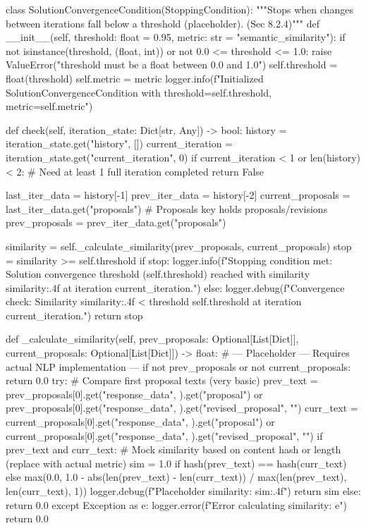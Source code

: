 \documentclass{amsbook}
\theoremstyle{definition}
\theoremstyle{remark}
\numberwithin{equation}{chapter} %
\begin{document}
\begin{python}
class SolutionConvergenceCondition(StoppingCondition):
    """Stops when changes between iterations fall below a threshold (placeholder). (Sec 8.2.4)"""
    def __init__(self, threshold: float = 0.95, metric: str = "semantic_similarity"):
        if not isinstance(threshold, (float, int)) or not 0.0 <= threshold <= 1.0:
             raise ValueError("threshold must be a float between 0.0 and 1.0")
        self.threshold = float(threshold)
        self.metric = metric
        logger.info(f"Initialized SolutionConvergenceCondition with threshold={self.threshold}, metric={self.metric}")

    def check(self, iteration_state: Dict[str, Any]) -> bool:
        history = iteration_state.get("history", [])
        current_iteration = iteration_state.get("current_iteration", 0)
        if current_iteration < 1 or len(history) < 2: # Need at least 1 full iteration completed
            return False

        last_iter_data = history[-1]
        prev_iter_data = history[-2]
        current_proposals = last_iter_data.get("proposals") # Proposals key holds proposals/revisions
        prev_proposals = prev_iter_data.get("proposals")

        similarity = self._calculate_similarity(prev_proposals, current_proposals)
        stop = similarity >= self.threshold
        if stop:
             logger.info(f"Stopping condition met: Solution convergence threshold ({self.threshold}) reached with similarity {similarity:.4f} at iteration {current_iteration}.")
        else:
             logger.debug(f"Convergence check: Similarity {similarity:.4f} < threshold {self.threshold} at iteration {current_iteration}.")
        return stop

    def _calculate_similarity(self, prev_proposals: Optional[List[Dict]], current_proposals: Optional[List[Dict]]) -> float:
        # --- Placeholder --- Requires actual NLP implementation ---
        if not prev_proposals or not current_proposals: return 0.0
        try:
            # Compare first proposal texts (very basic)
            prev_text = prev_proposals[0].get("response_data", {}).get("proposal") or prev_proposals[0].get("response_data", {}).get("revised_proposal", "")
            curr_text = current_proposals[0].get("response_data", {}).get("proposal") or current_proposals[0].get("response_data", {}).get("revised_proposal", "")
            if prev_text and curr_text:
                 # Mock similarity based on content hash or length (replace with actual metric)
                 sim = 1.0 if hash(prev_text) == hash(curr_text) else max(0.0, 1.0 - abs(len(prev_text) - len(curr_text)) / max(len(prev_text), len(curr_text), 1))
                 logger.debug(f"Placeholder similarity: {sim:.4f}")
                 return sim
            else: return 0.0
        except Exception as e:
             logger.error(f"Error calculating similarity: {e}")
             return 0.0



\end{python}
\end{document}
